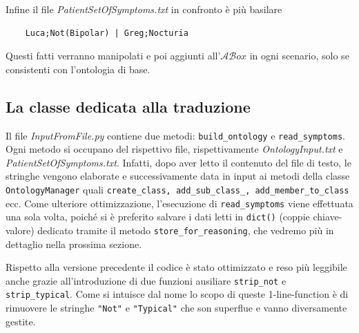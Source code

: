 Infine il file \emph{PatientSetOfSymptoms.txt} in confronto è più basilare
\begin{verbatim}
	Luca;Not(Bipolar) | Greg;Nocturia
\end{verbatim} 
Questi fatti verranno manipolati e poi aggiunti all'$\mathcal{AB}ox$ in ogni scenario, solo se consistenti con l'ontologia di base.

\subsection{La classe dedicata alla traduzione} \label{subSec: InputFile}
Il file \emph{InputFromFile.py} contiene due metodi:
\texttt{build_ontology} e \texttt{read_symptoms}.
Ogni metodo si occupano del rispettivo file, rispettivamente \emph{OntologyInput.txt} e \emph{PatientSetOfSymptoms.txt}.
Infatti, dopo aver letto il contenuto del file di testo,
le stringhe vengono elaborate e successivamente data in input ai metodi della classe \texttt{OntologyManager} quali 
\texttt{create_class, add_sub_class_, add_member_to_class} ecc.
Come ulteriore ottimizzazione, l'esecuzione di \texttt{read_symptoms} viene effettuata una sola volta, poiché
si è preferito salvare i dati letti in \texttt{dict()} (coppie chiave-valore) dedicato tramite il metodo
\texttt{store_for_reasoning}, che vedremo più in dettaglio nella prossima sezione.

Rispetto alla versione precedente il codice è stato ottimizzato e reso più leggibile anche grazie all'introduzione
di due funzioni ausiliare \texttt{strip_not} e \texttt{strip_typical}.
Come si intuisce dal nome lo scopo di queste 1-line-function è di rimuovere le stringhe \texttt{"Not"}
e \texttt{"Typical"} che son superflue e vanno diversamente gestite.

